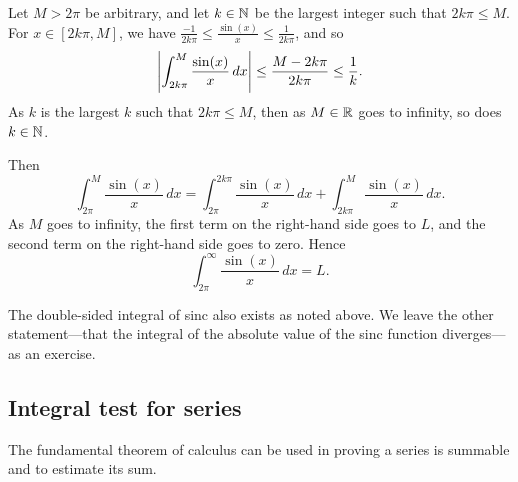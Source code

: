 \begin{example}
Let $M > 2\pi$ be arbitrary, and let $k \in {\mathbb{N}}$
be the largest integer such that $2k\pi \leq M$.
For $x \in [2k\pi,M]$, we have 
$\frac{-1}{2k\pi} \leq \frac{\sin(x)}{x} \leq \frac{1}{2k\pi}$, and so
\begin{equation*}
\left\lvert {\int_{2k\pi}^{M} \frac{\sin(x)}{x} \,dx } \right\rvert  \leq
\frac{M-2k\pi}{2k\pi} \leq \frac{1}{k} .
\end{equation*}
As $k$ is the largest $k$ such that $2k\pi \leq M$,
then as $M\in {\mathbb{R}}$ goes to infinity, so does $k \in {\mathbb{N}}$.

Then
\begin{equation*}
\int_{2\pi}^M \frac{\sin(x)}{x}\,dx
=
\int_{2\pi}^{2k\pi} \frac{\sin(x)}{x} \,dx
+
\int_{2k\pi}^{M} \frac{\sin(x)}{x} \,dx .
\end{equation*}
As $M$ goes to infinity,
the first term on the
right-hand side goes to $L$,
and the second term on the
right-hand side
goes to zero.  Hence
\begin{equation*}
\int_{2\pi}^\infty \frac{\sin(x)}{x} \,dx = L .
\end{equation*}

The double-sided integral of sinc also exists as noted above.
We leave the other statement---that the integral
of the absolute value of the sinc function diverges---as an exercise.
\end{example}

\subsection{Integral test for series}

The fundamental theorem 
of calculus can be used in proving a series is summable and to estimate its sum.

